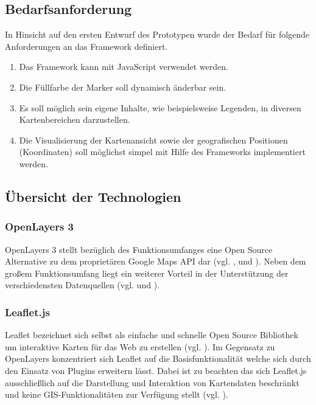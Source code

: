 \documentclass[../Bachelorarbeit.tex]{subfiles}
\begin{document}
\subsection{Bedarfsanforderung}
\label{Bedarf}
In Hinsicht auf den ersten Entwurf des Prototypen wurde der Bedarf für folgende Anforderungen an das Framework definiert.
\begin{enumerate}
	\item Das Framework kann mit JavaScript verwendet werden.
	\item Die Füllfarbe der Marker soll dynamisch änderbar sein.
	\item Es soll möglich sein eigene Inhalte,  wie beispielsweise Legenden, in diversen Kartenbereichen darzustellen.
	\item Die Visualisierung der Kartenansicht sowie der geografischen Positionen (Koordinaten) soll möglichst simpel mit Hilfe des Frameworks implementiert werden.
\end{enumerate}
 
\subsection{Übersicht der Technologien}

\subsubsection{OpenLayers 3}
OpenLayers 3 stellt bezüglich des Funktionsumfanges eine Open Source Alternative zu dem proprietären Google Maps \ac{API} dar (vgl. \cite{OpenlayersInfoSheet}, und \cite{VergleichApi}).
Neben dem großem Funktionsumfang liegt ein weiterer Vorteil in der Unterstützung der verschiedensten Datenquellen (vgl. \cite{Openlayers} und \cite[Abschnitt: Data Sources]{OpenlayersInfoSheet}). 

\subsubsection{Leaflet.js}
Leaflet bezeichnet sich selbst als einfache und schnelle Open Source Bibliothek um interaktive Karten für das Web zu erstellen (vgl. \cite{Leaflet}). 
Im Gegensatz zu OpenLayers konzentriert sich Leaflet auf die Basisfunktionalität welche sich durch den Einsatz von Plugins erweitern lässt.
Dabei ist zu beachten das sich Leaflet.js ausschließlich auf die Darstellung und Interaktion von Kartendaten beschränkt und keine \ac{GIS}-Funktionalitäten zur Verfügung stellt (vgl. \cite[Abschnitt: What Leaflet does not do]{LeafletMakeAMap}). 
\end{document}
